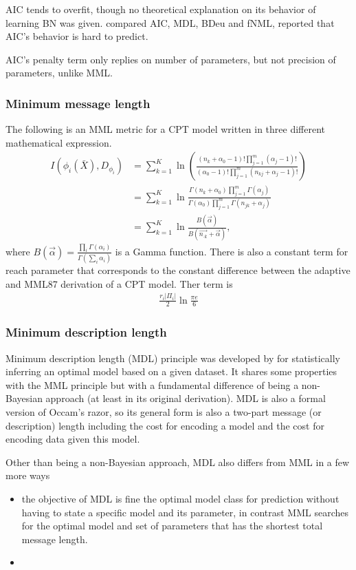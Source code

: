 AIC tends to overfit, though no theoretical explanation on its behavior of learning BN was given. \cite{liu2012empirical} compared AIC, MDL, BDeu and fNML, reported that AIC's behavior is hard to predict. 

AIC's penalty term only replies on number of parameters, but not precision of parameters, unlike MML. 


\subsubsection{Minimum message length}
The following is an MML metric for a CPT model written in three different mathematical expression. 
\begin{align}
\label{eq:mmlcpt}
I(\phi_i(\bar{X}), D_{\phi_i}) &= \sum_{k = 1}^{K} \ln \left(\frac{(n_k+\alpha_0-1)! \prod_{j=1}^{m} (\alpha_j - 1)!}{(\alpha_0-1)! \prod_{j=1}^m (n_{kj} + \alpha_j - 1)!} \right) \\
&= \sum_{k=1}^K \ln \frac{\Gamma(n_k + \alpha_0)\prod_{j=1}^m \Gamma(\alpha_j)}{\Gamma(\alpha_0) \prod_{j=1}^m\Gamma(n_{jk}+\alpha_j)} \\
&= \sum_{k=1}^K \ln \frac{B(\vec{\alpha})}{B(\vec{n_{\cdot k}} + \vec{\alpha})},
\end{align}
where $B(\vec{\alpha}) = \frac{\prod_i \Gamma(\alpha_i)}{\Gamma(\sum_i \alpha_i)}$ is a Gamma function. There is also a constant term for reach parameter that corresponds to the constant difference between the adaptive and MML87 derivation of a CPT model. Ther term is 
\begin{align*}
\frac{r_i |\Pi_i|}{2} \ln \frac{\pi e}{6}
\end{align*}


\subsubsection{Minimum description length}
Minimum description length (MDL) principle was developed by \cite{rissanen1978modeling} for statistically inferring an optimal model based on a given dataset. It shares some properties with the MML principle but with a fundamental difference of being a non-Bayesian approach (at least in its original derivation). MDL is also a formal version of Occam's razor, so its general form is also a two-part message (or description) length including the cost for encoding a model and the cost for encoding data given this model. 

Other than being a non-Bayesian approach, MDL also differs from MML in a few more ways \cite{baxter1994mdl} 
\begin{itemize}
\item the objective of MDL is fine the optimal model class for prediction without having to state a specific model and its parameter, in contrast MML searches for the optimal model and set of parameters that has the shortest total message length.
\item 
\end{itemize}

